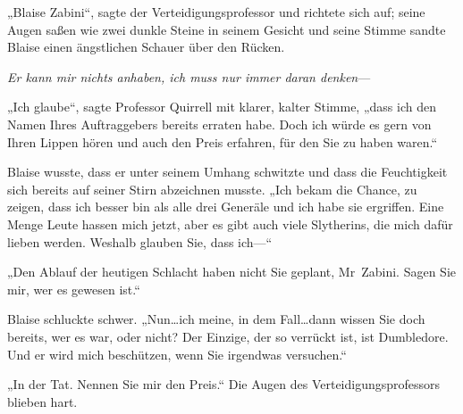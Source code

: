 „Blaise Zabini“, sagte der Verteidigungsprofessor und richtete sich auf; seine Augen saßen wie zwei dunkle Steine in seinem Gesicht und seine Stimme sandte Blaise einen ängstlichen Schauer über den Rücken.

\emph{Er kann mir nichts anhaben, ich muss nur immer daran denken}—

„Ich glaube“, sagte Professor Quirrell mit klarer, kalter Stimme, „dass ich den Namen Ihres Auftraggebers bereits erraten habe. Doch ich würde es gern von Ihren Lippen hören und auch den Preis erfahren, für den Sie zu haben waren.“

Blaise wusste, dass er unter seinem Umhang schwitzte und dass die Feuchtigkeit sich bereits auf seiner Stirn abzeichnen musste.
„Ich bekam die Chance, zu zeigen, dass ich besser bin als alle drei Generäle und ich habe sie ergriffen. Eine Menge Leute hassen mich jetzt, aber es gibt auch viele Slytherins, die mich dafür lieben werden. Weshalb glauben Sie, dass ich—“

„Den Ablauf der heutigen Schlacht haben nicht Sie geplant, Mr~Zabini. Sagen Sie mir, wer es gewesen ist.“

Blaise schluckte schwer.
„Nun…ich meine, in dem Fall…dann wissen Sie doch bereits, wer es war, oder nicht? Der Einzige, der so verrückt ist, ist Dumbledore. Und er wird mich beschützen, wenn Sie irgendwas versuchen.“

„In der Tat. Nennen Sie mir den Preis.“ Die Augen des Verteidigungsprofessors blieben hart.

